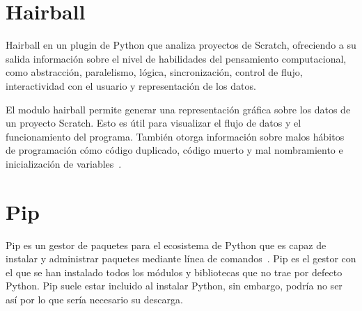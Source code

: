 \documentclass[a4paper, 12pt]{book}
\begin{document}

\section{Hairball} 
\label{sec:Hairball}

Hairball en un plugin de Python que analiza proyectos de Scratch, ofreciendo a su salida información sobre el nivel de habilidades del pensamiento computacional, como abstracción, paralelismo, lógica, sincronización, control de flujo, interactividad con el usuario y representación de los datos.

El modulo hairball permite generar una representación gráfica sobre los datos de un proyecto Scratch. Esto es útil para visualizar el flujo de datos y el funcionamiento del programa. También otorga información sobre malos hábitos de programación cómo código duplicado, código muerto y mal nombramiento e inicialización de variables~\cite{boe2013hairball}.

\section{Pip} 
\label{sec:pip}

Pip es un gestor de paquetes para el ecosistema de Python que es capaz de instalar y administrar paquetes mediante línea de comandos~\cite{pipWeb}. Pip es el gestor con el que se han instalado todos los módulos y bibliotecas que no trae por defecto Python. Pip suele estar incluido al instalar Python, sin embargo, podría no ser así por lo que sería necesario su descarga.
\end{document}
